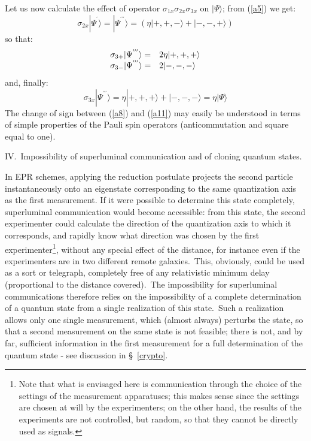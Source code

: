 \documentclass[12pt,onecolumn]{article}%
\begin{document}
Let us now calculate the effect of operator $\sigma_{1x}\sigma_{2x}\sigma
_{3x}$ on $|\Psi\rangle $; from (\ref{a5}) we get:
\begin{equation}
\sigma_{2x}|\Psi^{^{\prime}}\rangle =|\Psi^{^{\prime\prime\prime}}\rangle = \left(
\eta|+,+,-\rangle +|-,-,+\rangle \right)  \label{a9}%
\end{equation}
so that:
\begin{equation}%
\begin{array}
[c]{ll}%
\sigma_{3+}|\Psi^{^{\prime\prime\prime}}\rangle =  & 2\eta|+,+,+\rangle \\
\sigma_{3-}|\Psi^{^{\prime\prime\prime}}\rangle =  & 2|-,-,-\rangle 
\end{array}
\label{a10}%
\end{equation}
and, finally:
\begin{equation}
\sigma_{3x}|\Psi^{^{\prime\prime\prime}}\rangle = \eta|+,+,+\rangle +|
-,-,-\rangle =\eta|\Psi\rangle  \label{a11}%
\end{equation}
The change of sign between (\ref{a8}) and (\ref{a11}) may easily be understood
in terms of simple properties of the Pauli spin operators (anticommutation and
square equal to one).

\begin{center}
\bigskip\bigskip

\bigskip\bigskip IV.\ Impossibility of superluminal communication and of
cloning quantum states.
\end{center}

In EPR schemes, applying the reduction postulate projects the second particle
instantaneously onto an eigenstate corresponding to the same quantization axis
as the first measurement. If it were possible to determine this state
completely, superluminal communication would become accessible: from this
state, the second experimenter could calculate the direction of the
quantization axis to which it corresponds, and rapidly know what direction was
chosen by the first experimenter\footnote{Note that what is envisaged here is
communication through the choice of the settings of the measurement
apparatuses; this makes sense since the settings are chosen at will by the
experimenters; on the other hand, the results of the experiments are not
controlled, but random, so that they cannot be directly used as signals.},
without any special effect of the distance, for instance even if the
experimenters are in two different remote galaxies.\ This, obviously, could be
used as a sort or telegraph, completely free of any relativistic minimum delay
(proportional to the distance covered).\ The impossibility for superluminal
communications therefore relies on the impossibility of a complete
determination of a quantum state from a single realization of this
state.\ Such a realization allows only one single measurement, which (almost
always) perturbs the state, so that a second measurement on the same state is
not feasible; there is not, and by far, sufficient information in the first
measurement for a full determination of the quantum state - see discussion in
\S \ \ref{crypto}.
\end{document}
